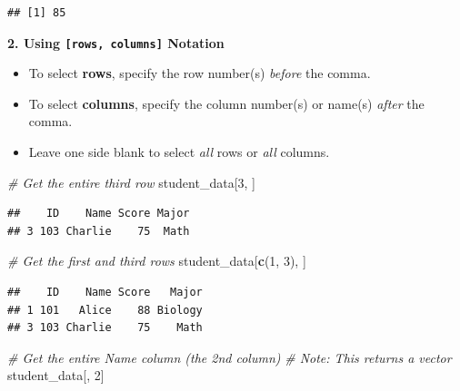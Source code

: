 \documentclass[
  11pt,
]{article}
\newenvironment{Shaded}{\begin{snugshade}}{\end{snugshade}}
\newcommand{\CommentTok}[1]{\textcolor[rgb]{0.56,0.35,0.01}{\textit{#1}}}
\newcommand{\DecValTok}[1]{\textcolor[rgb]{0.00,0.00,0.81}{#1}}
\newcommand{\FunctionTok}[1]{\textcolor[rgb]{0.13,0.29,0.53}{\textbf{#1}}}
\newcommand{\NormalTok}[1]{#1}
\newcommand{\SpecialCharTok}[1]{\textcolor[rgb]{0.81,0.36,0.00}{\textbf{#1}}}
\providecommand{\tightlist}{%
  \setlength{\itemsep}{0pt}\setlength{\parskip}{0pt}}
\begin{document}
\begin{Shaded}
\end{Shaded}

\begin{verbatim}
## [1] 85
\end{verbatim}

\textbf{2. Using \texttt{{[}rows,\ columns{]}} Notation}

\begin{itemize}
\tightlist
\item
  To select \textbf{rows}, specify the row number(s) \emph{before} the
  comma.
\item
  To select \textbf{columns}, specify the column number(s) or name(s)
  \emph{after} the comma.
\item
  Leave one side blank to select \emph{all} rows or \emph{all} columns.
\end{itemize}

\begin{Shaded}
\begin{Highlighting}[]
\CommentTok{\# Get the entire third row}
\NormalTok{student\_data[}\DecValTok{3}\NormalTok{, ]}
\end{Highlighting}
\end{Shaded}

\begin{verbatim}
##    ID    Name Score Major
## 3 103 Charlie    75  Math
\end{verbatim}

\begin{Shaded}
\begin{Highlighting}[]
\CommentTok{\# Get the first and third rows}
\NormalTok{student\_data[}\FunctionTok{c}\NormalTok{(}\DecValTok{1}\NormalTok{, }\DecValTok{3}\NormalTok{), ]}
\end{Highlighting}
\end{Shaded}

\begin{verbatim}
##    ID    Name Score   Major
## 1 101   Alice    88 Biology
## 3 103 Charlie    75    Math
\end{verbatim}

\begin{Shaded}
\begin{Highlighting}[]
\CommentTok{\# Get the entire \textquotesingle{}Name\textquotesingle{} column (the 2nd column)}
\CommentTok{\# Note: This returns a vector}
\NormalTok{student\_data[, }\DecValTok{2}\NormalTok{]}
\end{Highlighting}
\end{Shaded}
\end{document}
